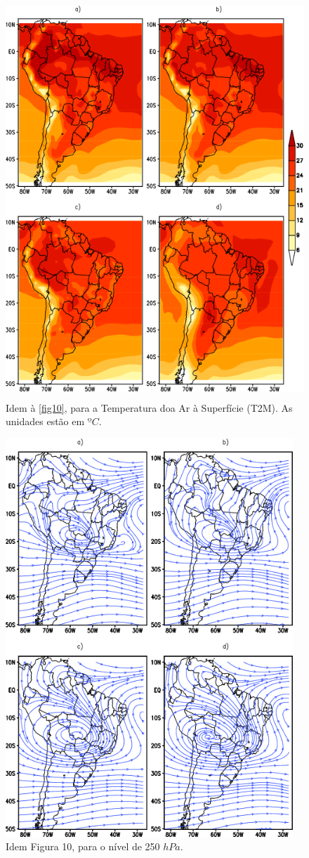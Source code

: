 \begin{figure}[!hbp]
\centering
\includegraphics[height=15cm]{./figs/media_tp2m_anl.png}
\caption{Idem à \autoref{fig10}, para a Temperatura doa Ar à Superfície (T2M). As unidades estão em $ºC$.}
\label{fig11}
\end{figure}

\begin{figure}[!hbp]
\centering
\includegraphics[height=15cm]{./figs/media_corrente_anl_250hPa.png}
\caption{Idem Figura 10, para o nível de 250 $hPa$.}
\label{fig12}
\end{figure}

